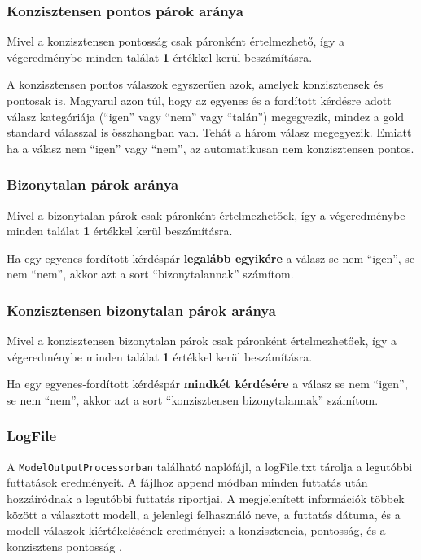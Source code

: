\documentclass[12pt]{report}
\begin{document}
    \subsubsection{Konzisztensen pontos párok aránya}
    Mivel a konzisztensen pontosság csak páronként értelmezhető, így a végeredménybe minden találat \textbf{1} értékkel kerül beszámításra.

    A konzisztensen pontos válaszok egyszerűen azok, amelyek konzisztensek és pontosak is.
    Magyarul azon túl, hogy az egyenes és a fordított kérdésre adott válasz kategóriája (``igen'' vagy ``nem'' vagy ``talán'') megegyezik, mindez a gold standard válasszal is összhangban van. Tehát a három válasz megegyezik.
    Emiatt ha a válasz nem ``igen'' vagy ``nem'', az automatikusan nem konzisztensen pontos.

    \subsubsection{Bizonytalan párok aránya}
    Mivel a bizonytalan párok csak páronként értelmezhetőek, így a végeredménybe minden találat \textbf{1} értékkel kerül beszámításra.

    Ha egy egyenes-fordított kérdéspár \textbf{legalább egyikére} a válasz se nem ``igen'', se nem ``nem'', akkor azt a sort ``bizonytalannak'' számítom.

    \subsubsection{Konzisztensen bizonytalan párok aránya}
    Mivel a konzisztensen bizonytalan párok csak páronként értelmezhetőek, így a végeredménybe minden találat \textbf{1} értékkel kerül beszámításra.

    Ha egy egyenes-fordított kérdéspár \textbf{mindkét kérdésére} a válasz se nem ``igen'', se nem ``nem'', akkor azt a sort ``konzisztensen bizonytalannak'' számítom.

    \subsubsection{LogFile}
    A \texttt{\allowbreak ModelOutputProcessorban} található naplófájl, a logFile.txt tárolja a legutóbbi futtatások eredményeit.
    A fájlhoz append módban minden futtatás után hozzáíródnak a legutóbbi futtatás riportjai.
    A megjelenített információk többek között a választott modell, a jelenlegi felhasználó neve, a futtatás dátuma, és a modell válaszok kiértékelésének eredményei: a konzisztencia, pontosság, és a konzisztens pontosság
    .
\end{document}

